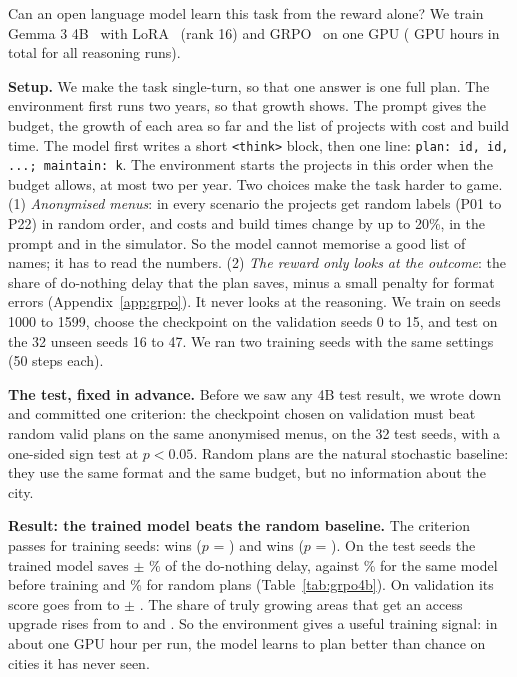 \documentclass{article}
\begin{document}
Can an open language model learn this task from the reward alone? We train Gemma 3 4B~\cite{gemmateam2025} with LoRA~\cite{hu2022} (rank 16) and GRPO~\cite{shao2024,guo2025} on one GPU (\grpoReasonGpuHours{} GPU hours in total for all reasoning runs).

\textbf{Setup.} We make the task single-turn, so that one answer is one full plan. The environment first runs two years, so that growth shows. The prompt gives the budget, the growth of each area so far and the list of projects with cost and build time. The model first writes a short \texttt{<think>} block, then one line: \texttt{plan: id, id, ...; maintain: k}. The environment starts the projects in this order when the budget allows, at most two per year. Two choices make the task harder to game. (1) \emph{Anonymised menus}: in every scenario the projects get random labels (P01 to P22) in random order, and costs and build times change by up to 20\%, in the prompt and in the simulator. So the model cannot memorise a good list of names; it has to read the numbers. (2) \emph{The reward only looks at the outcome}: the share of do-nothing delay that the plan saves, minus a small penalty for format errors (Appendix~\ref{app:grpo}). It never looks at the reasoning. We train on seeds 1000 to 1599, choose the checkpoint on the validation seeds 0 to 15, and test on the 32 unseen seeds 16 to 47. We ran two training seeds with the same settings (50 steps each).

\textbf{The test, fixed in advance.} Before we saw any 4B test result, we wrote down and committed one criterion: the checkpoint chosen on validation must beat random valid plans on the same anonymised menus, on the 32 test seeds, with a one-sided sign test at $p<0.05$. Random plans are the natural stochastic baseline: they use the same format and the same budget, but no information about the city.

\textbf{Result: the trained model beats the random baseline.} The criterion passes for \grpoFourCriterionPass{} training seeds: \grpoFourThinkAnonWinsRandomTestBest{} wins ($p$ = \grpoFourThinkAnonSignPRandomTestBest{}) and \grpoFourThinkAnonSeedOneWinsRandomTestBest{} wins ($p$ = \grpoFourThinkAnonSeedOneSignPRandomTestBest{}). On the test seeds the trained model saves \grpoFourTestBestMean{} $\pm$ \grpoFourTestBestStd{}\% of the do-nothing delay, against \grpoZeroFourThinkAnonTestFrac{}\% for the same model before training and \grpoRefRandomAnonTest{}\% for random plans (Table~\ref{tab:grpo4b}). On validation its score goes from \grpoFourThinkAnonScoreZero{} to \grpoFourValBestMean{} $\pm$ \grpoFourValBestStd{}. The share of truly growing areas that get an access upgrade rises from \grpoFourThinkAnonBoomHitZero{} to \grpoFourThinkAnonBoomHit{} and \grpoFourThinkAnonSeedOneBoomHit{}. So the environment gives a useful training signal: in about one GPU hour per run, the model learns to plan better than chance on cities it has never seen.
\end{document}
